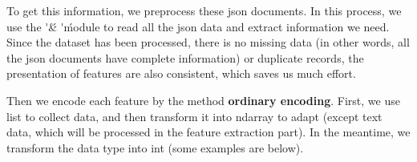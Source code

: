 \documentclass[12pt,a4paper]{article}
\begin{document}
\vspace{1em}
\setlength\parindent{4.5em}
\vspace{1em}

\setlength{\parindent}{2em}
To get this information, we preprocess these json documents. In this process, we use the \'\' \& \'\' module to read all the json data and extract information we need. Since the dataset has been processed, there is no missing data (in other words, all the json documents have complete information) or duplicate records, the presentation of features are also consistent, which saves us much effort. 

Then we encode each feature by the method \textbf{ordinary encoding}. First, we use list to collect data, and then transform it into ndarray to adapt (except text data, which will be processed in the feature extraction part). In the meantime, we transform the data type into int (some examples are below).
\end{document}

